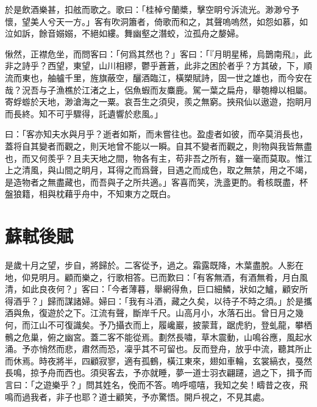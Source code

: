 於是飲酒樂甚，扣舷而歌之。歌曰：「桂棹兮蘭槳，擊空眀兮泝流光。渺渺兮予懷，望美人兮天一方。」客有吹洞簫者，{倚}歌而和之，其聲嗚嗚然，如怨如慕，如泣如訴，餘音嫋嫋，不絕如縷。舞幽壑之潛蛟，泣孤舟之嫠婦。%

愀然，正襟危坐，而問客曰：「何爲其然也？」客曰：「『月眀星稀，烏鵲南飛』，此非之詩乎？西望，東望，山川相繆，鬱乎蒼蒼，此非之困於者乎？方其破，下，順流而東也，舳艫千里，旌旗蔽空，釃酒臨江，橫槊賦詩，固一世之雄也，而今安在哉？況吾与子漁樵於江渚之上，侶魚蝦而友麋鹿。駕一葉之扁舟，舉匏樽以相屬。寄蜉蝣於天地，渺滄海之一粟。哀吾生之須臾，羨之無窮。挾飛仙以遨遊，抱眀月而長終。知不可乎驟得，託遺響於悲風。」

曰：「客亦知夫水與月乎？逝者如斯，而未嘗往也。盈虛者如彼，而卒莫消長也，蓋将自其變者而觀之，則天地曾不能以一瞬。自其不變者而觀之，則物與我皆無盡也，而又何羨乎？且夫天地之間，物各有主，苟非吾之所有，雖一毫而莫取。惟江上之清風，與山間之眀月，耳得之而爲聲，目遇之而成色，取之無禁，用之不竭，是造物者之無盡藏也，而吾與子之所共適。」客喜而笑，洗盞更酌。肴核既盡，杯盤狼籍，相與枕藉乎舟中，不知東方之既白。

\theendnotes

\section[後赤壁賦\quad{\small 蘇軾}]{{\normalsize 蘇軾}\quad 後賦}
是歲十月之望，步自，將歸於。二客從予，過之。霜露既降，木葉盡脫。人影在地，仰見明月。顧而樂之，行歌相答。已而歎曰：「有客無酒，有酒無肴，月白風清，如此良夜何？」客曰：「今者薄暮，舉網得魚，巨口細鱗，狀如之鱸，顧安所得酒乎？」歸而謀諸婦。婦曰：「我有斗酒，藏之久矣，以待子不時之須。」於是攜酒與魚，復遊於之下。江流有聲，斷岸千尺。山高月小，水落石出。曾日月之幾何，而江山不可復識矣。予乃攝衣而上，履巉巖，披蒙茸，踞虎豹，登虬龍，攀栖鶻之危巢，俯之幽宮。蓋二客不能從焉。劃然長嘯，草木震動，山鳴谷應，風起水{涌}。予亦悄然而悲，肅然而恐，凜乎其不可留也。反而登舟，放乎中流，聽其所止而休焉。時夜將半，四顧寂寥，適有孤鶴，橫江東來，翅如車輪，玄裳縞衣，戞然長鳴，掠予舟而西也。須臾客去，予亦就睡，夢一道士羽衣翩躚，過之下，揖予而言曰：「之遊樂乎？」問其姓名，俛而不答。嗚呼噫嘻，我知之矣！疇昔之夜，飛鳴而過我者，非子也耶？道士顧笑，予亦驚{悟}。開戶視之，不見其處。%

